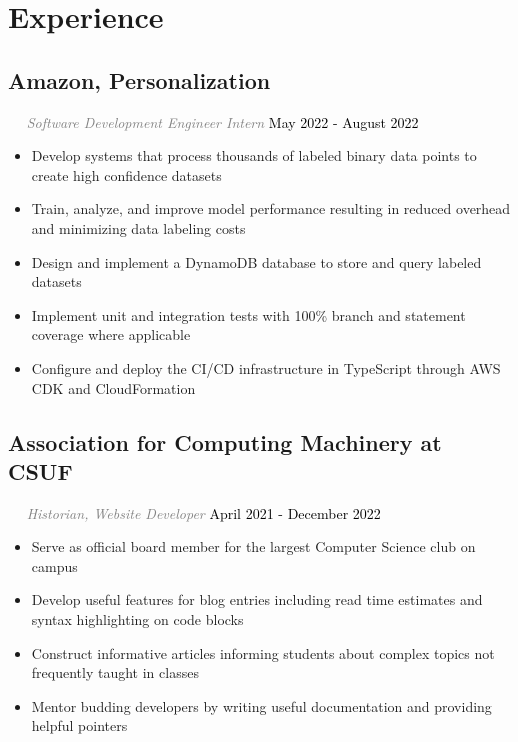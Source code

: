 \documentclass{article}
\newcommand{\resumesection}[3]{
    \subsection*{#1}
    \ 
    \ 
    \small
    \textcolor{grey}{\emph{#2}}
    \normalsize
    \hfill
    \textcolor{black}{#3}
    \normalsize
}
\begin{document}
\section*{Experience}
\resumesection{Amazon, Personalization}{Software Development Engineer Intern}{May 2022 - August 2022}
\begin{itemize}
    \item Develop systems that process thousands of labeled binary data points to create high confidence datasets
    \item Train, analyze, and improve model performance resulting in reduced overhead and minimizing data labeling costs
    \item Design and implement a DynamoDB database to store and query labeled datasets
    \item Implement unit and integration tests with 100\% branch and statement coverage where applicable
    \item Configure and deploy the CI/CD infrastructure in TypeScript through AWS CDK and CloudFormation
\end{itemize}
\resumesection{Association for Computing Machinery at CSUF}{Historian, Website Developer}{April 2021 - December 2022}
\begin{itemize}
    \item Serve as official board member for the largest Computer Science club on campus
    \item Develop useful features for blog entries including read time estimates and syntax highlighting on code blocks
    \item Construct informative articles informing students about complex topics not frequently taught in classes
    \item Mentor budding developers by writing useful documentation and providing helpful pointers
\end{itemize}
\end{document}
